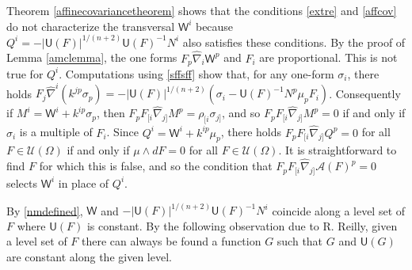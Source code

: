 \documentclass [leqno, 10pt]{amsart}
\theoremstyle{definition}
\numberwithin{equation}{section}
\newcommand{\uinf}{\mathscr{U}}
\newcommand{\muf}{\mu}
\newcommand{\Om}{\Omega}
\newcommand{\A}{\mathscr{A}}
\newcommand{\U}{\mathsf{U}}
\newcommand{\nm}{\mathsf{W}}
\newcommand{\si}{\sigma}
\newcommand{\hnabla}{\widehat{\nabla}}
\begin{document}
Theorem \ref{affinecovariancetheorem} shows that the conditions \eqref{extre} and \eqref{affcov} do not characterize the transversal $\nm^{i}$ because $Q^{i}= -|\U(F)|^{1/(n+2)}\U(F)^{-1}N^{i}$ also satisfies these conditions. By the proof of Lemma \ref{amclemma}, the one forms $F_{p}\hnabla_{i}\nm^{p}$ and $F_{i}$ are proportional. This is not true for $Q^{i}$. Computations using \eqref{sffsff} show that, for any one-form $\si_{i}$, there holds $F_{j}\hnabla^{i}(k^{jp}\si_{p}) = -|\U(F)|^{1/(n+2)}(\si_{i} - \U(F)^{-1}N^{p}\muf_{p}F_{i})$. Consequently if $M^{i} = \nm^{i} + k^{ip}\si_{p}$, then $F_{p}F_{[i}\hnabla_{j]}M^{p} = \rho_{[i}\si_{j]}$, and so $F_{p}F_{[i}\hnabla_{j]}M^{p} = 0$ if and only if $\si_{i}$ is a multiple of $F_{i}$. Since $Q^{i} = \nm^{i} + k^{ip}\muf_{p}$, there holds $F_{p}F_{[i}\hnabla_{j]}Q^{p} = 0$ for all $F \in \uinf(\Om)$ if and only if $\muf \wedge dF = 0$ for all $F \in \uinf(\Om)$. It is straightforward to find $F$ for which this is false, and so the condition that $F_{p}F_{[i}\hnabla_{j]}\A(F)^{p} = 0$ selects $\nm^{i}$ in place of $Q^{i}$.

By \eqref{nmdefined}, $\nm$ and $-|\U(F)|^{1/(n+2)}\U(F)^{-1}N^{i}$ coincide along a level set of $F$ where $\U(F)$ is constant. By the following observation due to R. Reilly, given a level set of $F$ there can always be found a function $G$ such that $G$ and $\U(G)$ are constant along the given level. 
\end{document}
